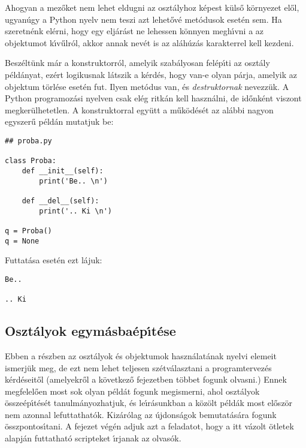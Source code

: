 Ahogyan a mez\H{o}ket nem lehet eldugni az oszt\'alyhoz k\'epest k\"uls\H{o} k\"ornyezet el\H{o}l, ugyan\'ugy a Python 
nyelv nem teszi azt lehet\H{o}v\'e met\'odusok eset\'en sem. Ha szeretn\'enk el\'erni, hogy egy elj\'ar\'ast ne lehessen 
k\"onnyen megh\'{\i}vni a az objektumot k\'{\i}v\H{u}lr\'ol, akkor annak nev\'et is az al\'ah\'uz\'as karakterrel kell 
kezdeni. 

Besz\'elt\"unk m\'ar a konstruktorr\'ol, amelyik szab\'alyosan fel\'ep\'{\i}ti az oszt\'aly p\'eld\'anyat, 
ez\'ert logikusnak l\'atszik a k\'erd\'es, hogy van-e olyan p\'arja, amelyik az objektum t\"orl\'ese eset\'en 
fut. Ilyen met\'odus van, \'es {\sl destruktornak}  nevezz\"uk. A Python programoz\'asi nyelven 
csak el\'eg ritk\'an kell haszn\'alni, de id\H{o}nk\'ent viszont megker\"ulhetetlen. A konstruktorral egy\"utt a 
m\H{u}k\"od\'es\'et az al\'abbi nagyon egyszer\H{u} p\'eld\'an mutatjuk be:

\begin{Verbatim}[fontsize=\small]
## proba.py

class Proba:
    def __init__(self):
        print('Be.. \n')

    def __del__(self):
        print('.. Ki \n')

q = Proba()
q = None
\end{Verbatim}

\noindent Futtat\'asa eset\'en ezt l\'ajuk:

\begin{Verbatim}[fontsize=\small]
Be..

.. Ki
\end{Verbatim}



\subsection{Oszt\'alyok egym\'asba\'ep\'{\i}t\'ese}

Ebben a r\'eszben az oszt\'alyok \'es objektumok haszn\'alat\'anak nyelvi elemeit ismerj\"uk meg, de ezt nem lehet teljesen 
sz\'etv\'alasztani a programtervez\'es k\'erd\'eseit\H{o}l (amelyekr\H{o}l a k\"ovetkez\H{o} fejezetben t\"obbet fogunk 
olvasni.) Ennek megfelel\H{o}en most sok olyan p\'eld\'at fogunk megismerni, ahol oszt\'alyok \"ossze\'ep\'{\i}t\'es\'et 
tanulm\'anyozhatjuk, \'es le\'{\i}r\'asunkban a k\"oz\"olt p\'eld\'ak most el\H{o}sz\"or nem azonnal lefuttathat\'ok. 
Kiz\'ar\'olag az \'ujdons\'agok bemutat\'as\'ara fogunk \"osszpontos\'{\i}tani. A fejezet v\'eg\'en adjuk azt a 
feladatot, hogy a itt v\'azolt \"otletek alapj\'an futtathat\'o scripteket \'{\i}rjanak az olvas\'ok.

